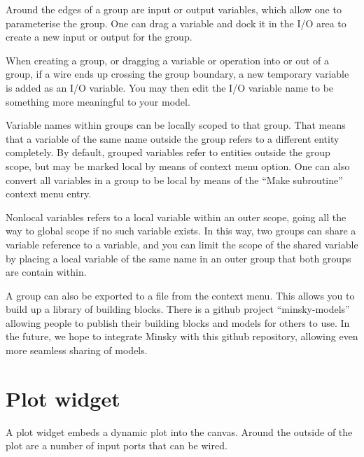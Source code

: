 Around the edges of a group are input or output variables, which allow
one to parameterise the group. One can drag a variable and dock it in
the I/O area to create a new input or output for the group.

When creating a group, or dragging a variable or operation into or out
of a group, if a wire ends up crossing the group boundary, a new
temporary variable is added as an I/O variable. You may then edit the
I/O variable name to be something more meaningful to your model.

Variable names within groups can be locally scoped to that group. That
means that a variable of the same name outside the group refers to a
different entity completely. By default, grouped variables refer to
entities outside the group scope, but may be marked local by means of
context menu option. One can also convert all variables in a group to
be local by means of the ``Make subroutine'' context menu entry.

Nonlocal variables refers to a local variable within an outer scope,
going all the way to global scope if no such variable exists. In this
way, two groups can share a variable reference to a variable, and you
can limit the scope of the shared variable by placing a local variable
of the same name in an outer group that both groups are contain
within.

A group can also be exported to a file from the context menu.  This
allows you to build up a library of building blocks. There is a github
project ``minsky-models'' allowing people to publish their building
blocks and models for others to use. In the future, we hope to
integrate Minsky with this github repository, allowing even more
seamless sharing of models.

\section{Plot widget}
\label{PlotWidget}

A plot widget embeds a dynamic plot into the canvas. Around the
outside of the plot are a number of input ports that can be wired.

